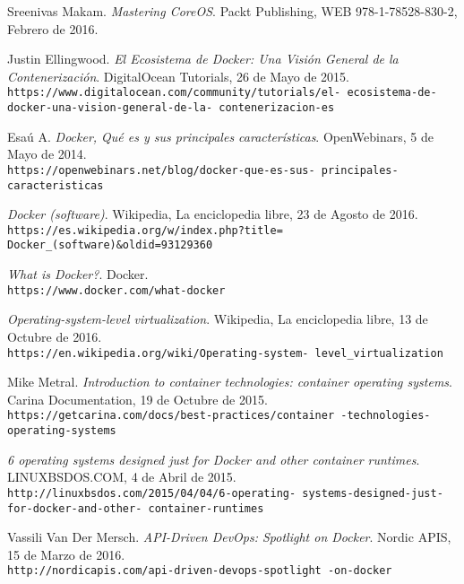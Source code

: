 \begin{thebibliography}{9}
Sreenivas Makam. 
\textit{Mastering CoreOS}. 
Packt Publishing, WEB 978-1-78528-830-2, Febrero de 2016.
 
Justin Ellingwood.
\textit{El Ecosistema de Docker: Una Visión General de la Contenerización}. 
DigitalOcean Tutorials, 26 de Mayo de 2015.
\\\texttt{https://www.digitalocean.com/community/tutorials/el- ecosistema-de-docker-una-vision-general-de-la-
contenerizacion-es}

Esaú A.
\textit{Docker, Qué es y sus principales características}. 
OpenWebinars, 5 de Mayo de 2014.
\\\texttt{https://openwebinars.net/blog/docker-que-es-sus-
principales-caracteristicas}


\textit{Docker (software)}. 
Wikipedia, La enciclopedia libre, 23 de Agosto de 2016.
\\\texttt{https://es.wikipedia.org/w/index.php?title= Docker\_(software)\&oldid=93129360}

\textit{What is Docker?}. 
Docker.
\\\texttt{https://www.docker.com/what-docker}

\textit{Operating-system-level virtualization}. 
Wikipedia, La enciclopedia libre, 13 de Octubre de 2016.
\\\texttt{https://en.wikipedia.org/wiki/Operating-system-
level\_virtualization}

Mike Metral.
\textit{Introduction to container technologies: container operating systems}. 
Carina Documentation, 19 de Octubre de 2015.
\\\texttt{https://getcarina.com/docs/best-practices/container
-technologies-operating-systems}

\textit{6 operating systems designed just for Docker and other container runtimes}. 
LINUXBSDOS.COM, 4 de Abril de 2015.
\\\texttt{http://linuxbsdos.com/2015/04/04/6-operating-
systems-designed-just-for-docker-and-other-
container-runtimes}

Vassili Van Der Mersch.
\textit{API-Driven DevOps: Spotlight on Docker}. 
Nordic APIS, 15 de Marzo de 2016.
\\\texttt{http://nordicapis.com/api-driven-devops-spotlight
-on-docker}


\end{thebibliography}
